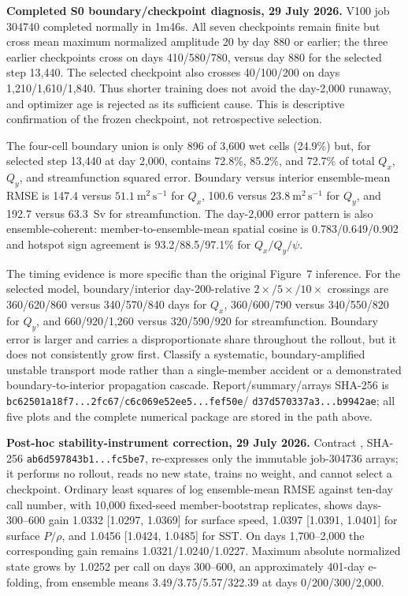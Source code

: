 \documentclass[11pt]{article}
\begin{document}
\textbf{Completed S0 boundary/checkpoint diagnosis, 29 July 2026.}
V100 job 304740 completed normally in 1m46s.  All seven checkpoints remain
finite but cross mean maximum normalized amplitude 20 by day 880 or earlier;
the three earlier checkpoints cross on days 410/580/780, versus day 880 for
the selected step 13,440.  The selected checkpoint also crosses 40/100/200
on days 1,210/1,610/1,840.  Thus shorter training does not avoid the
day-2,000 runaway, and optimizer age is rejected as its sufficient cause.
This is descriptive confirmation of the frozen checkpoint, not retrospective
selection.

The four-cell boundary union is only 896 of 3,600 wet cells (24.9\%) but,
for selected step 13,440 at day 2,000, contains 72.8\%, 85.2\%, and 72.7\%
of total \(Q_x\), \(Q_y\), and streamfunction squared error.  Boundary versus
interior ensemble-mean RMSE is 147.4 versus
\(51.1~\mathrm{m^2\,s^{-1}}\) for \(Q_x\), 100.6 versus
\(23.8~\mathrm{m^2\,s^{-1}}\) for \(Q_y\), and 192.7 versus 63.3~Sv
for streamfunction.  The day-2,000 error pattern is also ensemble-coherent:
member-to-ensemble-mean spatial cosine is 0.783/0.649/0.902 and hotspot sign
agreement is 93.2/88.5/97.1\% for \(Q_x/Q_y/\psi\).

The timing evidence is more specific than the original Figure~7 inference.
For the selected model, boundary/interior day-200-relative
\(2\times/5\times/10\times\) crossings are
360/620/860 versus 340/570/840 days for \(Q_x\),
360/600/790 versus 340/550/820 for \(Q_y\), and
660/920/1,260 versus 320/590/920 for streamfunction.  Boundary error is
larger and carries a disproportionate share throughout the rollout, but it
does not consistently grow first.  Classify a systematic,
boundary-amplified unstable transport mode rather than a single-member
accident or a demonstrated boundary-to-interior propagation cascade.
Report/summary/arrays SHA-256 is
\texttt{bc62501a18f7...2fc67}/\texttt{c6c069e52ee5...fef50e}/
\texttt{d37d570337a3...b9942ae}; all five plots and the complete numerical
package are stored in the path above.

\textbf{Post-hoc stability-instrument correction, 29 July 2026.}
Contract , SHA-256
\texttt{ab6d597843b1...fc5be7}, re-expresses only the immutable job-304736
arrays; it performs no rollout, reads no new state, trains no weight, and
cannot select a checkpoint.  Ordinary least squares of log ensemble-mean
RMSE against ten-day call number, with 10,000 fixed-seed member-bootstrap
replicates, shows days-300--600 gain
1.0332 [1.0297, 1.0369] for surface speed,
1.0397 [1.0391, 1.0401] for surface \(P/\rho\), and
1.0456 [1.0424, 1.0485] for SST.  On days 1,700--2,000 the corresponding
gain remains 1.0321/1.0240/1.0227.  Maximum absolute normalized state grows
by 1.0252 per call on days 300--600, an approximately 401-day e-folding,
from ensemble means 3.49/3.75/5.57/322.39 at days 0/200/300/2,000.
\end{document}
